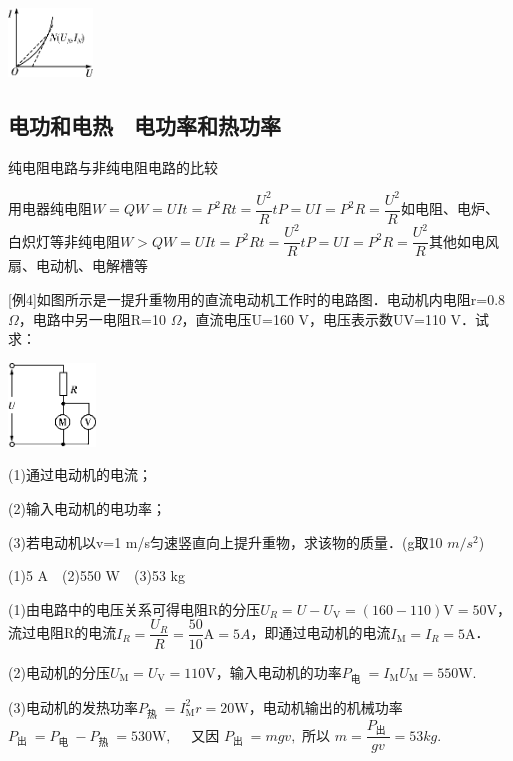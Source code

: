 \documentclass[cn,10.5pt,chinese,mac,chinesefont=founder]{elegantbook}
\begin{document}
\begin{center}\includegraphics[width=0.88681in,height=0.71667in]{media/image313.png}\end{center}

\subsection{电功和电热　电功率和热功率}
纯电阻电路与非纯电阻电路的比较

用电器纯电阻$W=Q W=U I t=P^{2} R t=\dfrac{U^{2}}{R} t P=U I=P^{2} R=\dfrac{U^{2}}{R}$如电阻、电炉、白炽灯等非纯电阻$W>Q W=U I t=P^{2} R t=\dfrac{U^{2}}{R} t P=U I=P^{2} R=\dfrac{U^{2}}{R}$其他如电风扇、电动机、电解槽等

{[}例4{]}如图所示是一提升重物用的直流电动机工作时的电路图．电动机内电阻r=0.8
$\Omega$，电路中另一电阻R=10 $\Omega$，直流电压U=160 V，电压表示数UV=110 V．试求：

\begin{center}\includegraphics[width=0.91528in,height=0.87708in]{media/image314.png}\end{center}

(1)通过电动机的电流；

(2)输入电动机的电功率；

(3)若电动机以v=1 m/s匀速竖直向上提升重物，求该物的质量．(g取10 $m/s^2$)
\begin{solution}
	(1)5 A　(2)550 W　(3)53 kg
	
	(1)由电路中的电压关系可得电阻R的分压$U_{R}=U-U_{\mathrm{V}}=(160-110) \mathrm{V}=50 \mathrm{V}$，流过电阻R的电流$I_{R}=\dfrac{U_{R}}{R}=\dfrac{50}{10} \mathrm{A}=5A$，即通过电动机的电流$I_{\mathrm{M}}=I_{R}=5 \mathrm{A}$．

(2)电动机的分压$U_{\mathrm{M}}=U_{\mathrm{V}}=110 \mathrm{V}$，输入电动机的功率$P_{\text {电 }}=I_{\mathrm{M}} U_{\mathrm{M}}=550 \mathrm{W}$.

(3)电动机的发热功率$P_{\text {热 }}=I_{\mathrm{M}}^2 r=20 \mathrm{W}$，电动机输出的机械功率$P_{\text {出 }}=P_{\text {电 }}-P_{\text {热 }}=530 \mathrm{W}, \quad$ 又因 $P_{\text {出 }}=m g v,$ 所以 $m=\dfrac{P_{\text {出 }}}{g v}=53 kg$.
\end{solution}
\end{document}
